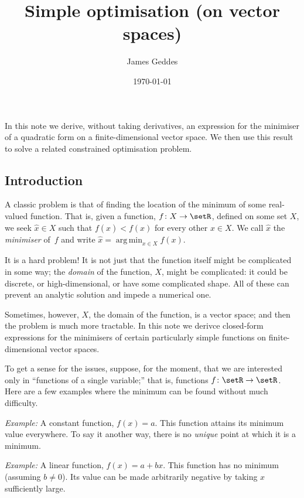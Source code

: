 \documentclass[10pt, a4paper]{article}
\title{Simple optimisation (on vector spaces)}
\author{James Geddes}
\date{\today}
\DeclareMathOperator*{\argmin}{arg\,min}
\newcommand{\eg}{\emph{Example:}}
\begin{document}
\maketitle

In this note we derive, without taking derivatives, an expression for
the minimiser of a quadratic form on a finite-dimensional vector
space. We then use this result to solve a related constrained
optimisation problem.

\subsection*{Introduction}
A classic problem is that of finding the location of the minimum of
some real-valued function. That is, given a function,
$f\colon X\to\setR$, defined on some set $X$, we seek $\hat{x}\in X$ such
  that $f(\hat{x})<f(x)$ for every other $x\in X$. We call $\hat{x}$ the 
  \emph{minimiser} of~$f$ and write $\hat{x} = \argmin_{x\in X} f(x)$.

It is a hard problem! It is not just that the function itself might be
complicated in some way; the \emph{domain} of the function, $X$, might
be complicated: it could be discrete, or high-dimensional, or have
some complicated shape. All of these can prevent an analytic solution
and impede a numerical one.

Sometimes, however, $X$, the domain of the function, is a vector space;
and then the problem is much more tractable. In this note we derivce
closed-form expressions for the minimisers of certain particularly
simple functions on finite-dimensional vector spaces.

To get a sense for the issues, suppose, for the moment, that we are
interested only in “functions of a single variable;” that is,
functions $f\colon \setR\to\setR$. Here are a few examples where the
minimum can be found without much difficulty.

\eg{} A constant function, $f(x) = a$. This function attains its
minimum value everywhere. To say it another way, there is no
\emph{unique} point at which it is a minimum.

\eg{} A linear function,
$f(x) = a + bx$. This function has no minimum (assuming $b\neq0$). Its
value can be made arbitrarily negative by taking $x$ sufficiently
large.
\end{document}
